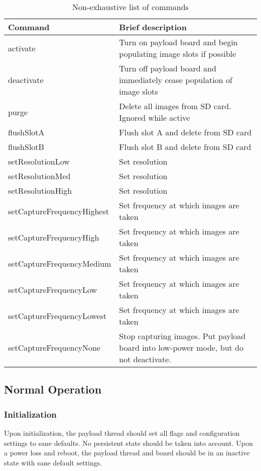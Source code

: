 \documentclass{article}
\begin{document}
\begin{table}
\begin{center}
\caption{Non-exhaustive list of commands}
\begin{tabular}{| l | l |}
    \hline 
    Command & Brief description \\ \hline
    activate & Turn on payload board and begin populating image slots if possible \\ \hline
    deactivate & Turn off payload board and immediately cease population of image slots \\ \hline
    purge & Delete all images from SD card. Ignored while active \\ \hline
    flushSlotA & Flush slot A and delete from SD card \\ \hline
    flushSlotB & Flush slot B and delete from SD card \\ \hline
    setResolutionLow & Set resolution\\ \hline
    setResolutionMed & Set resolution\\ \hline
    setResolutionHigh & Set resolution\\ \hline
    setCaptureFrequencyHighest & Set frequency at which images are taken\\ \hline
    setCaptureFrequencyHigh & Set frequency at which images are taken\\ \hline
    setCaptureFrequencyMedium & Set frequency at which images are taken\\ \hline
    setCaptureFrequencyLow & Set frequency at which images are taken\\ \hline
    setCaptureFrequencyLowest & Set frequency at which images are taken\\ \hline
    setCaptureFrequencyNone & Stop capturing images. Put payload board into low-power mode, but do not deactivate.\\ \hline
\end{tabular}
\end{center}
\end{table}

\subsection{Normal Operation}
\subsubsection{Initialization}
Upon initialization, the payload thread should set all flags and configuration
settings to sane defaults. No persistent state should be taken into account. Upon
a power loss and reboot, the payload thread and board should be in an inactive state
with sane default settings.
\end{document}
